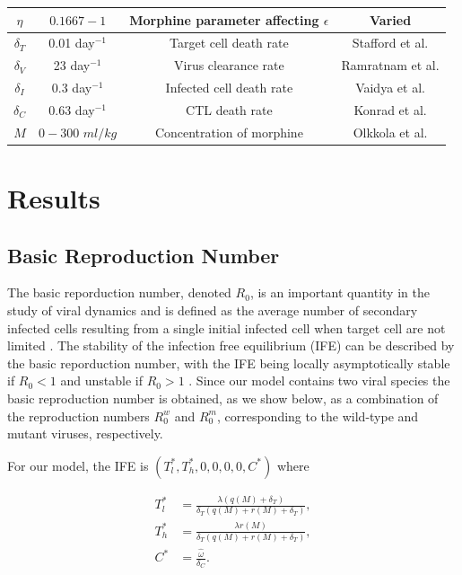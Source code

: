 \documentclass[11pt, oneside]{article}    %
\begin{document}
\begin{table}[H]
\begin{tabular}{|c|c|c|c|}
\hline
$\eta$ & $0.1667-1$ & Morphine parameter affecting $\epsilon$ & Varied \\
\hline
$\delta_T$ & 0.01 day$^{-1}$ & Target cell death rate & Stafford et al. \\
\hline
$\delta_V$ & 23 day$^{-1}$ & Virus clearance rate & Ramratnam et al. \\
\hline
$\delta_I$ & 0.3 day$^{-1}$ & Infected cell death rate & Vaidya et al. \\
\hline
$\delta_C$ & 0.63 day$^{-1}$ & CTL death rate & Konrad et al.\\
\hline
$M$ & $0-300$ $ml/kg$ & Concentration of morphine & Olkkola et al.\\
\hline
\end{tabular}
\end{table}

\section{Results}
\subsection{Basic Reproduction Number}

The basic reporduction number, denoted $R_0$, is an important quantity in the study of viral dynamics and is defined as the average number of secondary infected cells resulting from a single initial infected cell when target cell are not limited \cite{Castillo-Chavez}. The stability of the infection free equilibrium (IFE) can be described by the basic reporduction number, with the IFE being locally asymptotically stable if $R_0 < 1$ and unstable if $R_0 >1$ \cite{Castillo-Chavez}. Since our model contains two viral species the basic reproduction number is obtained, as we show below, as a combination of the reproduction numbers $R_0^w$ and $R_0^m$, corresponding to the wild-type and mutant viruses, respectively. 


\vspace{5mm}

	For our model, the IFE is $(T_l^*,T_h^*,0,0,0,0,C^*)$ where

\begin{align*}
T_l^* & =  \frac{\lambda (q(M) + \delta_T)}{\delta_T (q(M) + r(M) +\delta_T)},\\
T_h^* & =  \frac{\lambda r(M)}{\delta_T (q(M) + r(M) +\delta_T)},\\
C^* & =  \frac{\hat{\omega}}{\delta_C}.\\
\end{align*}
\end{document}
